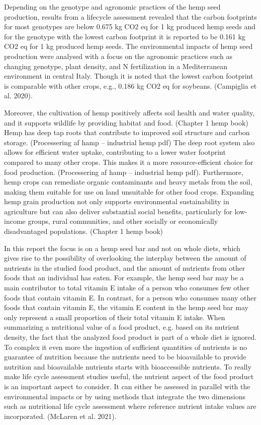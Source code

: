 \vspace{1em}
Depending on the genotype and agronomic practices of the hemp seed production, results from a lifecycle assessment revealed that the carbon footprints for most genotypes are below 0.675 kg CO2 eq for 1 kg produced hemp seeds and for the genotype with the lowest carbon footprint it is reported to be 0.161 kg CO2 eq for 1 kg produced hemp seeds. The environmental impacts of hemp seed production were analysed with a focus on the agronomic practices such as changing genotype, plant density, and N fertilization in a Mediterranean environment in central Italy. Though it is noted that the lowest carbon footprint is comparable with other crops, e.g., 0.186 kg CO2 eq for soybeans. (Campiglia et al. 2020).

\vspace{1em}
Moreover, the cultivation of hemp positively affects soil health and water quality, and it supports wildlife by providing habitat and food. (Chapter 1 hemp book) Hemp has deep tap roots that contribute to improved soil structure and carbon storage. (Processering af hamp – industrial hemp pdf) The deep root system also allows for efficient water uptake, contributing to a lower water footprint compared to many other crops. This makes it a more resource-efficient choice for food production. (Processering af hamp – industrial hemp pdf). Furthermore, hemp crops can remediate organic contaminants and heavy metals from the soil, making them suitable for use on land unsuitable for other food crops. Expanding hemp grain production not only supports environmental sustainability in agriculture but can also deliver substantial social benefits, particularly for low-income groups, rural communities, and other socially or economically disadvantaged populations. (Chapter 1 hemp book)

\vspace{1em}
In this report the focus is on a hemp seed bar and not on whole diets, which gives rise to the possibility of overlooking the interplay between the amount of nutrients in the studied food product, and the amount of nutrients from other foods that an individual has eaten. For example, the hemp seed bar may be a main contributor to total vitamin E intake of a person who consumes few other foods that contain vitamin E. In contrast, for a person who consumes many other foods that contain vitamin E, the vitamin E content in the hemp seed bar may only represent a small proportion of their total vitamin E intake. When summarizing a nutritional value of a food product, e.g. based on its nutrient density, the fact that the analyzed food product is part of a whole diet is ignored. To complex it even more the ingestion of sufficient quantities of nutrients is no guarantee of nutrition because the nutrients need to be bioavailable to provide nutrition and bioavailable nutrients starts with bioaccessible nutrients. To really make life cycle assessment studies useful, the nutrient aspect of the food product is an important aspect to consider. It can either be assessed in parallel with the environmental impacts or by using methods that integrate the two dimensions such as nutritional life cycle assessment where reference nutrient intake values are incorporated. (McLaren et al. 2021).

